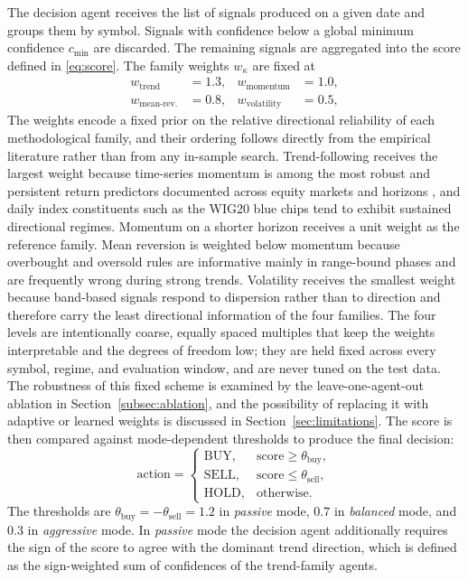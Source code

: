 \documentclass{ieeeaccess}
\begin{document}
The decision agent receives the list of signals produced on a given date and groups them by symbol. Signals with confidence below a global minimum confidence $c_{\min}$ are discarded. The remaining signals are aggregated into the score defined in \eqref{eq:score}. The family weights $w_\kappa$ are fixed at
\begin{equation}
\begin{aligned}
w_\mathrm{trend} &= 1.3, & w_\mathrm{momentum} &= 1.0, \\
w_\mathrm{mean\text{-}rev.} &= 0.8, & w_\mathrm{volatility} &= 0.5,
\end{aligned}
\end{equation}
The weights encode a fixed prior on the relative directional reliability of each methodological family, and their ordering follows directly from the empirical literature rather than from any in-sample search. Trend-following receives the largest weight because time-series momentum is among the most robust and persistent return predictors documented across equity markets and horizons \cite{moskowitz2012,asness2013}, and daily index constituents such as the WIG20 blue chips tend to exhibit sustained directional regimes. Momentum on a shorter horizon receives a unit weight as the reference family. Mean reversion is weighted below momentum because overbought and oversold rules are informative mainly in range-bound phases and are frequently wrong during strong trends. Volatility receives the smallest weight because band-based signals respond to dispersion rather than to direction and therefore carry the least directional information of the four families. The four levels are intentionally coarse, equally spaced multiples that keep the weights interpretable and the degrees of freedom low; they are held fixed across every symbol, regime, and evaluation window, and are never tuned on the test data. The robustness of this fixed scheme is examined by the leave-one-agent-out ablation in Section~\ref{subsec:ablation}, and the possibility of replacing it with adaptive or learned weights is discussed in Section~\ref{sec:limitations}. The score is then compared against mode-dependent thresholds to produce the final decision:
\begin{equation}
\mathrm{action} =
\begin{cases}
\mathrm{BUY}, & \mathrm{score} \geq \theta_\text{buy}, \\
\mathrm{SELL}, & \mathrm{score} \leq \theta_\text{sell}, \\
\mathrm{HOLD}, & \mathrm{otherwise}.
\end{cases}
\end{equation}
The thresholds are $\theta_\text{buy} = -\theta_\text{sell} = 1.2$ in \emph{passive} mode, $0.7$ in \emph{balanced} mode, and $0.3$ in \emph{aggressive} mode. In \emph{passive} mode the decision agent additionally requires the sign of the score to agree with the dominant trend direction, which is defined as the sign-weighted sum of confidences of the trend-family agents.
\end{document}
